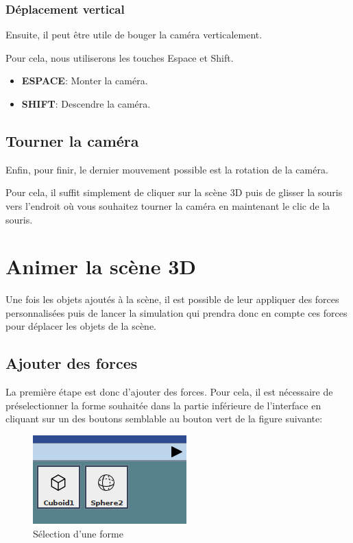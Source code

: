 \documentclass[11pt]{report}
\begin{document}
\subsection{Déplacement vertical}

\hypertarget{moveV}{Ensuite, il peut être utile de bouger la caméra verticalement.} Pour cela, nous utiliserons les touches Espace et Shift.

\begin{itemize}
  \item \textbf{ESPACE}: Monter la caméra.
  \item \textbf{SHIFT}: Descendre la caméra.
\end{itemize}

\section{Tourner la caméra}

\hypertarget{rotate}{Enfin, pour finir, le dernier mouvement possible est la rotation de la caméra.} Pour cela, il suffit simplement de cliquer sur la scène 3D puis de glisser la souris vers l'endroit où vous souhaitez tourner la caméra en maintenant le clic de la souris.


\chapter{Animer la scène 3D}

Une fois les objets ajoutés à la scène, il est possible de leur appliquer des forces personnalisées puis de lancer la simulation qui prendra
donc en compte ces forces pour déplacer les objets de la scène.

\section{Ajouter des forces}

La première étape est donc d'ajouter des forces. Pour cela, il est nécessaire de préselectionner la forme souhaitée dans la partie inférieure
de l'interface en cliquant sur un des boutons semblable au bouton vert de la figure suivante:

\begin{figure}[h]
  \centering
  \includegraphics{./bouton_forme.png}
  \caption{Sélection d'une forme}
\end{figure}
\end{document}
